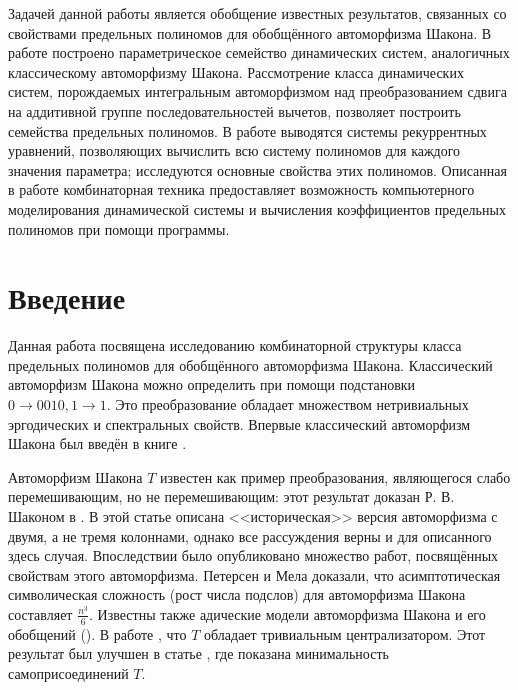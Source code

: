 \documentclass[14pt, a4paper, russian]{report}
\begin{document}
Задачей данной работы является обобщение известных результатов, связанных со свойствами предельных полиномов для обобщённого автоморфизма Шакона. В работе построено параметрическое семейство динамических систем, аналогичных классическому автоморфизму Шакона. Рассмотрение класса динамических систем, порождаемых интегральным автоморфизмом над преобразованием сдвига на аддитивной группе последовательностей вычетов, позволяет построить семейства предельных полиномов. В работе выводятся системы рекуррентных уравнений, позволяющих вычислить всю систему полиномов для каждого значения параметра; исследуются основные свойства этих полиномов. Описанная в работе комбинаторная техника предоставляет возможность компьютерного моделирования динамической системы и вычисления коэффициентов предельных полиномов при помощи программы.


\tableofcontents{}

\chapter*{Введение}
Данная работа посвящена исследованию комбинаторной структуры класса предельных полиномов для обобщённого автоморфизма Шакона. Классический автоморфизм Шакона можно определить при помощи подстановки $0 \to 0010, 1 \to 1$. Это преобразование обладает множеством нетривиальных эргодических и спектральных свойств. Впервые классический автоморфизм Шакона был введён в книге \cite{friedman}. 

Автоморфизм Шакона $T$ известен как пример преобразования, являющегося слабо перемешивающим, но не перемешивающим: этот результат доказан Р. В. Шаконом в \cite{mixing}. В этой статье описана <<историческая>> версия автоморфизма с двумя, а не тремя колоннами, однако все рассуждения верны и для описанного здесь случая. Впоследствии было опубликовано множество работ, посвящённых свойствам этого автоморфизма. Петерсен и Мела доказали, что асимптотическая символическая сложность (рост числа подслов) для автоморфизма Шакона составляет $\frac{n^3}{6}$. Известны также адические модели автоморфизма Шакона и его обобщений (\cite{park}). В работе \cite{deljunco}, что $T$ обладает тривиальным централизатором. Этот результат был улучшен в статье \cite{joinings}, где показана минимальность самоприсоединений $T$. 
\end{document}
